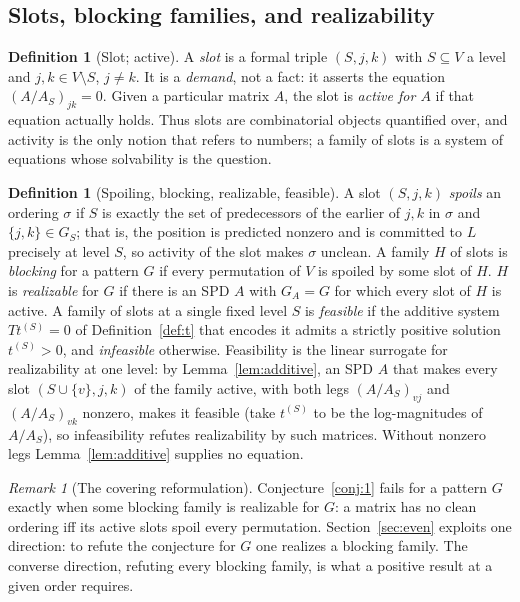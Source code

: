 \documentclass[11pt]{article}
\theoremstyle{plain}
\theoremstyle{definition}
\newtheorem{definition}[theorem]{Definition}
\theoremstyle{remark}
\newtheorem{remark}[theorem]{Remark}
\begin{document}
\begin{aiblock}
\subsection{Slots, blocking families, and realizability}

\begin{definition}[Slot; active]\label{def:slots}
A \emph{slot} is a formal triple $(S,j,k)$ with $S\subseteq V$ a level and $j,k\in V\setminus S$,
$j\neq k$. It is a \emph{demand}, not a fact: it asserts the equation $(A/A_S)_{jk}=0$. Given a
particular matrix $A$, the slot is \emph{active for $A$} if that equation actually holds. Thus slots
are combinatorial objects quantified over, and activity is the only notion that refers to numbers; a
family of slots is a system of equations whose solvability is the question.
\end{definition}

\begin{definition}[Spoiling, blocking, realizable, feasible]\label{def:blocking}
A slot $(S,j,k)$ \emph{spoils} an ordering $\sigma$ if $S$ is exactly the set of predecessors of the
earlier of $j,k$ in $\sigma$ and $\{j,k\}\in G_S$; that is, the position is predicted nonzero and is
committed to $L$ precisely at level $S$, so activity of the slot makes $\sigma$ unclean. A family $H$
of slots is \emph{blocking} for a pattern $G$ if every permutation of $V$ is spoiled by some slot of
$H$. $H$ is \emph{realizable} for $G$ if there is an SPD $A$ with $G_A=G$ for which every slot of $H$
is active. A family of slots at a single fixed level $S$ is \emph{feasible} if the additive system
$Tt^{(S)}=0$ of Definition~\ref{def:t} that encodes it admits a strictly positive solution
$t^{(S)}>0$, and \emph{infeasible} otherwise. Feasibility is the linear surrogate for realizability
at one level: by Lemma~\ref{lem:additive}, an SPD $A$ that makes every slot $(S\cup\{v\},j,k)$ of
the family active, with both legs $(A/A_S)_{vj}$ and $(A/A_S)_{vk}$ nonzero, makes it feasible (take
$t^{(S)}$ to be the log-magnitudes of $A/A_S$), so infeasibility refutes realizability by such
matrices. Without nonzero legs Lemma~\ref{lem:additive} supplies no equation.
\end{definition}

\begin{remark}[The covering reformulation]\label{rem:covering}
Conjecture~\ref{conj:1} fails for a pattern $G$ exactly when some blocking family is realizable for
$G$: a matrix has no clean ordering iff its active slots spoil every permutation.
Section~\ref{sec:even} exploits one direction: to refute the conjecture for $G$ one realizes a
blocking family. The converse direction, refuting every blocking family, is what a positive result at
a given order requires.
\end{remark}


\end{aiblock}
\end{document}
